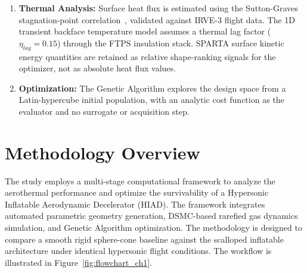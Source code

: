 \begin{enumerate}
    \item \textbf{Thermal Analysis:} Surface heat flux is estimated using the Sutton-Graves stagnation-point correlation~\cite{sutton1971gravesh}, validated against IRVE-3 flight data. The 1D transient backface temperature model assumes a thermal lag factor ($\eta_{lag} = 0.15$) through the FTPS insulation stack. SPARTA surface kinetic energy quantities are retained as relative shape-ranking signals for the optimizer, not as absolute heat flux values.

    \item \textbf{Optimization:} The Genetic Algorithm explores the design space from a Latin-hypercube initial population, with an analytic cost function as the evaluator and no surrogate or acquisition step.
\end{enumerate}

\section{Methodology Overview}
The study employs a multi-stage computational framework to analyze the aerothermal performance and optimize the survivability of a Hypersonic Inflatable Aerodynamic Decelerator (HIAD). The framework integrates automated parametric geometry generation, DSMC-based rarefied gas dynamics simulation, and Genetic Algorithm optimization. The methodology is designed to compare a smooth rigid sphere-cone baseline against the scalloped inflatable architecture under identical hypersonic flight conditions. The workflow is illustrated in Figure~\ref{fig:flowchart_ch1}.

